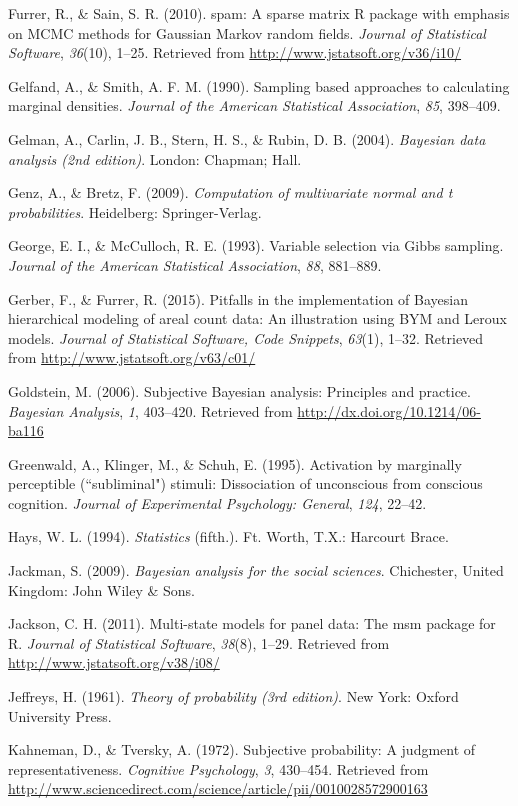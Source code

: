 \documentclass[american,man]{apa6}
\begin{document}
Furrer, R., \& Sain, S. R. (2010). spam: A sparse matrix R package with
emphasis on MCMC methods for Gaussian Markov random fields.
\emph{Journal of Statistical Software}, \emph{36}(10), 1--25. Retrieved
from \url{http://www.jstatsoft.org/v36/i10/}

Gelfand, A., \& Smith, A. F. M. (1990). Sampling based approaches to
calculating marginal densities. \emph{Journal of the American
Statistical Association}, \emph{85}, 398--409.

Gelman, A., Carlin, J. B., Stern, H. S., \& Rubin, D. B. (2004).
\emph{Bayesian data analysis (2nd edition)}. London: Chapman; Hall.

Genz, A., \& Bretz, F. (2009). \emph{Computation of multivariate normal
and t probabilities}. Heidelberg: Springer-Verlag.

George, E. I., \& McCulloch, R. E. (1993). Variable selection via Gibbs
sampling. \emph{Journal of the American Statistical Association},
\emph{88}, 881--889.

Gerber, F., \& Furrer, R. (2015). Pitfalls in the implementation of
Bayesian hierarchical modeling of areal count data: An illustration
using BYM and Leroux models. \emph{Journal of Statistical Software, Code
Snippets}, \emph{63}(1), 1--32. Retrieved from
\url{http://www.jstatsoft.org/v63/c01/}

Goldstein, M. (2006). Subjective Bayesian analysis: Principles and
practice. \emph{Bayesian Analysis}, \emph{1}, 403--420. Retrieved from
\url{http://dx.doi.org/10.1214/06-ba116}

Greenwald, A., Klinger, M., \& Schuh, E. (1995). Activation by
marginally perceptible (``subliminal") stimuli: Dissociation of
unconscious from conscious cognition. \emph{Journal of Experimental
Psychology: General}, \emph{124}, 22--42.

Hays, W. L. (1994). \emph{Statistics} (fifth.). Ft. Worth, T.X.:
Harcourt Brace.

Jackman, S. (2009). \emph{Bayesian analysis for the social sciences}.
Chichester, United Kingdom: John Wiley \& Sons.

Jackson, C. H. (2011). Multi-state models for panel data: The msm
package for R. \emph{Journal of Statistical Software}, \emph{38}(8),
1--29. Retrieved from \url{http://www.jstatsoft.org/v38/i08/}

Jeffreys, H. (1961). \emph{Theory of probability (3rd edition)}. New
York: Oxford University Press.

Kahneman, D., \& Tversky, A. (1972). Subjective probability: A judgment
of representativeness. \emph{Cognitive Psychology}, \emph{3}, 430--454.
Retrieved from
\url{http://www.sciencedirect.com/science/article/pii/0010028572900163}
\end{document}
